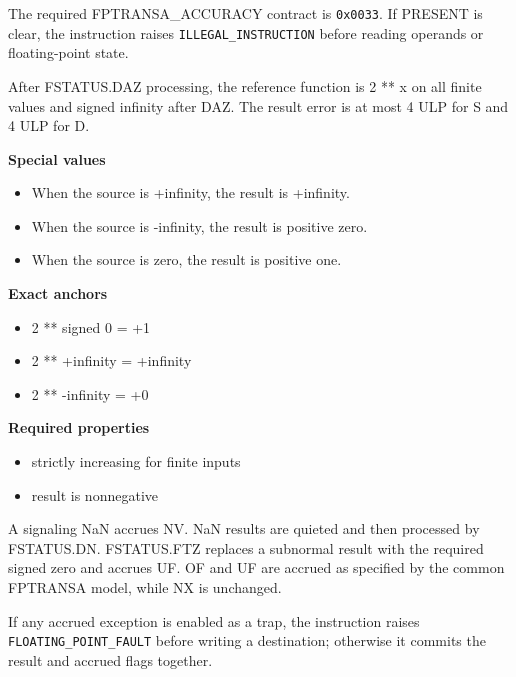 The required FPTRANSA\_ACCURACY contract is \texttt{0x0033}. If PRESENT is clear, the instruction raises \texttt{ILLEGAL\_INSTRUCTION} before reading operands or floating-point state.

After FSTATUS.DAZ processing, the reference function is 2 ** x on all finite values and signed infinity after DAZ. The result error is at most 4 ULP for S and 4 ULP for D.

\textbf{Special values}\par
\begin{itemize}
\item When the source is +infinity, the result is +infinity.
\item When the source is -infinity, the result is positive zero.
\item When the source is zero, the result is positive one.
\end{itemize}

\textbf{Exact anchors}\par
\begin{itemize}
\item 2 ** signed 0 = +1
\item 2 ** +infinity = +infinity
\item 2 ** -infinity = +0
\end{itemize}

\textbf{Required properties}\par
\begin{itemize}
\item strictly increasing for finite inputs
\item result is nonnegative
\end{itemize}

A signaling NaN accrues NV. NaN results are quieted and then processed by FSTATUS.DN. FSTATUS.FTZ replaces a subnormal result with the required signed zero and accrues UF. OF and UF are accrued as specified by the common FPTRANSA model, while NX is unchanged.

If any accrued exception is enabled as a trap, the instruction raises \texttt{FLOATING\_POINT\_FAULT} before writing a destination; otherwise it commits the result and accrued flags together.
